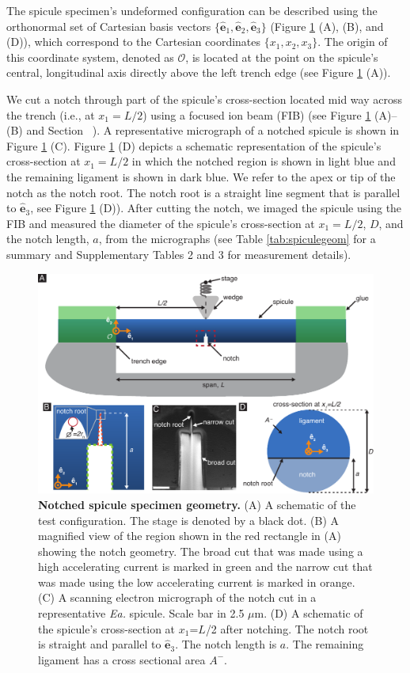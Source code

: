 \documentclass[12pt,onecolumn]{article}
\makeatletter
\DeclareRobustCommand*{\nameref}[1]{%
      \emph{\myorg@nameref{#1}}%
    }%
\newcommand{\ex}{\hat{\mathbf{e}}_1}
\newcommand{\ey}{\hat{\mathbf{e}}_2}
\newcommand{\ez}{\hat{\mathbf{e}}_3}
\newcommand{\EA}{\textit{Ea.\@}\xspace}
\makeatother
\begin{document}
\begin{bibunit}
The spicule specimen's undeformed configuration can be described using the orthonormal set of Cartesian basis vectors $\{\ex,\ey,\ez\}$ (Figure \ref{fig:notch} (A), (B), and (D)), which correspond to the Cartesian coordinates $\{x_1,x_2,x_3\}$. The origin of this coordinate system, denoted as $\mathcal{O}$, is located at the point on the spicule's central, longitudinal axis directly above the left trench edge (see Figure \ref{fig:notch} (A)).

We cut a notch through part of the spicule's cross-section located mid way across the trench (i.e., at $x_1=L/2$) using a focused ion beam (FIB) (see Figure \ref{fig:notch} (A)--(B) and Section~\nameref{sec:notchconfig}). A representative micrograph of a notched spicule is shown in Figure \ref{fig:notch} (C). Figure \ref{fig:notch} (D) depicts a schematic representation of the spicule's cross-section at $x_1=L/2$ in which the notched region is shown in light blue and the remaining ligament is shown in dark blue. We refer to the apex or tip of the notch as the notch root. The notch root is a straight line segment that is parallel to $\ez$, see Figure \ref{fig:notch} (D)). After cutting the notch, we imaged the spicule using the FIB and measured the diameter of the spicule's cross-section at $x_1=L/2$, $D$, and the notch length, $a$, from the micrographs (see Table \ref{tab:spiculegeom} for a summary and Supplementary Tables 2 and 3 for measurement details). 
%
			\begin{figure}[hb!]
			\centering
			\includegraphics[width=\textwidth]{../Figures/FigureNotch/Figure3_V7.pdf}
			\caption{\textbf{Notched spicule specimen geometry.} (A) A schematic of the test configuration. The stage is denoted by a black dot. (B) A magnified view of the region shown in the red rectangle in (A) showing the notch geometry. The broad cut that was made using a high accelerating current is marked in green and the narrow cut that was made using the low accelerating current is marked in orange. (C) A scanning electron micrograph of the notch cut in a representative \EA spicule. Scale bar in 2.5 $\mu$m. (D) A schematic of the spicule's cross-section at $x_1$=$L$/2 after notching. The notch root is straight and parallel to $\ez$. The notch length is $a$. The remaining ligament has a cross sectional area $A^-$.}
			\label{fig:notch}
			\end{figure}


\end{bibunit}
\end{document}
